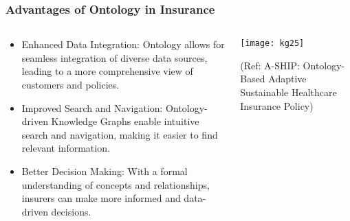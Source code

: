 \begin{frame}[fragile]
\frametitle{Advantages of Ontology in Insurance}

\begin{columns}
    \begin{column}[T]{0.6\linewidth}
		\begin{itemize}
		\item Enhanced Data Integration: Ontology allows for seamless integration of diverse data sources, leading to a more comprehensive view of customers and policies.
		\item Improved Search and Navigation: Ontology-driven Knowledge Graphs enable intuitive search and navigation, making it easier to find relevant information.
		\item Better Decision Making: With a formal understanding of concepts and relationships, insurers can make more informed and data-driven decisions.
		\end{itemize}

    \end{column}
    \begin{column}[T]{0.4\linewidth}  
		\begin{center}
		\texttt{[image: kg25]}

		{\tiny (Ref: A-SHIP: Ontology-Based Adaptive Sustainable Healthcare Insurance Policy)}
		\end{center}    
    \end{column}
  \end{columns}
\end{frame}

